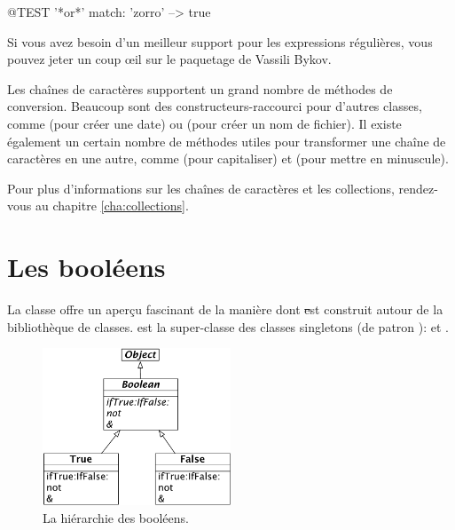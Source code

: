 \documentclass[a4paper,10pt,twoside]{book}
\begin{document}
\begin{code}{@TEST}
'*or*' match: 'zorro' --> true
\end{code}

Si vous avez besoin d'un meilleur support pour les expressions
régulières, vous pouvez jeter un coup \oe il sur le paquetage
 de Vassili Bykov. %

Les chaînes de caractères supportent un grand nombre de
méthodes de conversion. Beaucoup sont des constructeurs-raccourci
pour d'autres classes, comme  
(pour créer une date)
ou 
(pour créer un nom de fichier).
Il existe également un certain nombre de méthodes utiles pour
transformer une chaîne de caractères en une autre, comme
(pour capitaliser) 
et 
(pour mettre en minuscule).

Pour plus d'informations sur les chaînes de caractères et les
collections, rendez-vous au chapitre \ref{cha:collections}.


\section{Les booléens}

La classe  offre un aperçu fascinant de la
manière dont \st est construit autour de la bibliothèque de classes. 
 est la super-classe  des classes
singletons (de patron ):  et .

\begin{figure}[ht]
	{\centerline {\includegraphics[width=0.5\textwidth]{BooleanHierarchy}}}
\caption{La hiérarchie des booléens.}
\end{figure}
\end{document}
